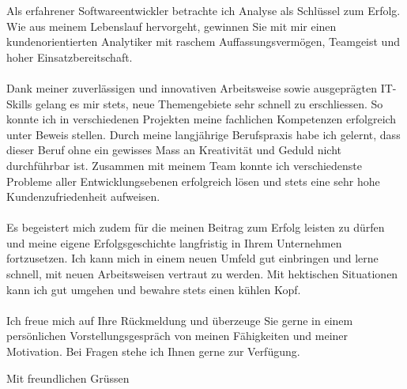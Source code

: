 \documentclass[a4paper,12pt]{letter}
\begin{document}
\renewcommand{\headrulewidth}{0pt}
\parbox[t][20mm]{50mm}{\fromAdress \\\\ \fromTel} \\
\par\vspace{10mm}
\parbox[b][15mm]{90mm}{\fromDate}

\par 
\textbf{}

\toContact \\\\


Als erfahrener Softwareentwickler betrachte ich Analyse als Schlüssel zum Erfolg. Wie aus
meinem Lebenslauf hervorgeht, gewinnen Sie mit mir einen kundenorientierten Analytiker mit
raschem Auffassungsvermögen, Teamgeist und hoher Einsatzbereitschaft. \\\\
Dank meiner zuverlässigen und innovativen Arbeitsweise sowie ausgeprägten IT-Skills gelang
es mir stets, neue Themengebiete sehr schnell zu erschliessen. So konnte ich in
verschiedenen Projekten meine fachlichen Kompetenzen erfolgreich unter Beweis stellen. Durch meine langjährige Berufspraxis habe ich gelernt, dass dieser Beruf ohne ein gewisses
Mass an Kreativität und Geduld nicht durchführbar ist. Zusammen mit meinem Team konnte
ich verschiedenste Probleme aller Entwicklungsebenen erfolgreich lösen und stets eine sehr
hohe Kundenzufriedenheit aufweisen.\\\\
Es begeistert mich zudem für die \toName meinen Beitrag zum Erfolg leisten zu dürfen und
meine eigene Erfolgsgeschichte langfristig in Ihrem Unternehmen fortzusetzen. Ich kann mich
in einem neuen Umfeld gut einbringen und lerne schnell, mit neuen Arbeitsweisen vertraut zu
werden. Mit hektischen Situationen kann ich gut umgehen und bewahre stets einen kühlen
Kopf.\\\\
Ich freue mich auf Ihre Rückmeldung und überzeuge Sie gerne in einem persönlichen
Vorstellungsgespräch von meinen Fähigkeiten und meiner Motivation.
Bei Fragen stehe ich Ihnen gerne zur Verfügung.
\vspace{10mm}
\par\hspace{90mm}Mit freundlichen Grüssen
\par\vspace{15mm}\hspace{90mm}\fromName
\end{document}
